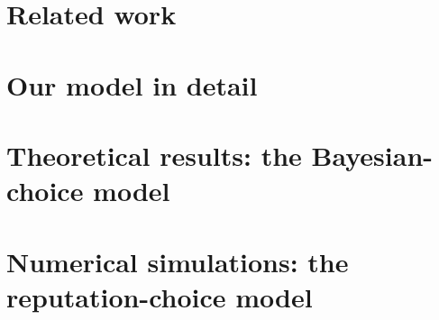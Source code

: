 \documentclass[12pt]{article}
\newcommand{\TheoryModel}{Bayesian-choice model\xspace}
\newcommand{\ExptsModel}{reputation-choice model\xspace}
\begin{document}


\section{Related work}
\label{sec:related-work}


\section{Our model in detail}
\label{sec:model}


\section{Theoretical results: the \TheoryModel}
\label{sec:theory}


%

%

%

%

\section{Numerical simulations: the \ExptsModel}
\label{sec:sim}






\end{document}
